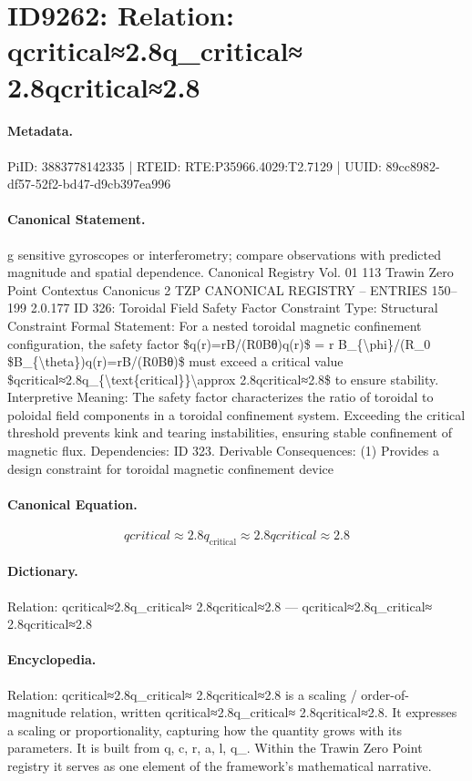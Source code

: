 \section*{ID9262: Relation: qcritical≈2.8q\_critical≈ 2.8qcritical≈2.8}
\paragraph{Metadata.}
PiID: 3883778142335 | RTEID: RTE:P35966.4029:T2.7129 | UUID: 89cc8982-df57-52f2-bd47-d9cb397ea996

\paragraph{Canonical Statement.}
g sensitive gyroscopes or interferometry; compare observations with predicted magnitude and spatial dependence. Canonical Registry Vol. 01 113 Trawin Zero Point Contextus Canonicus 2 TZP CANONICAL REGISTRY – ENTRIES 150–199 2.0.177 ID 326: Toroidal Field Safety Factor Constraint Type: Structural Constraint Formal Statement: For a nested toroidal magnetic confinement configuration, the safety factor \$q(r)=rB/(R0Bθ)q(r)\$ = r B\_\{\textbackslash{}phi\}/(R\_0 \$B\_\{\textbackslash{}theta\})q(r)=rB/(R0Bθ)\$ must exceed a critical value \$qcritical≈2.8q\_\{\textbackslash{}text\{critical\}\}\textbackslash{}approx 2.8qcritical≈2.8\$ to ensure stability. Interpretive Meaning: The safety factor characterizes the ratio of toroidal to poloidal field components in a toroidal confinement system. Exceeding the critical threshold prevents kink and tearing instabilities, ensuring stable confinement of magnetic flux. Dependencies: ID 323. Derivable Consequences: (1) Provides a design constraint for toroidal magnetic confinement device

\paragraph{Canonical Equation.}
\[
qcritical≈2.8q_{\text{critical}}\approx 2.8qcritical≈2.8
\]

\paragraph{Dictionary.}
Relation: qcritical≈2.8q\_critical≈ 2.8qcritical≈2.8 — qcritical≈2.8q\_critical≈ 2.8qcritical≈2.8

\paragraph{Encyclopedia.}
Relation: qcritical≈2.8q\_critical≈ 2.8qcritical≈2.8 is a scaling / order-of-magnitude relation, written qcritical≈2.8q\_critical≈ 2.8qcritical≈2.8. It expresses a scaling or proportionality, capturing how the quantity grows with its parameters. It is built from q, c, r, a, l, q\_. Within the Trawin Zero Point registry it serves as one element of the framework's mathematical narrative.
